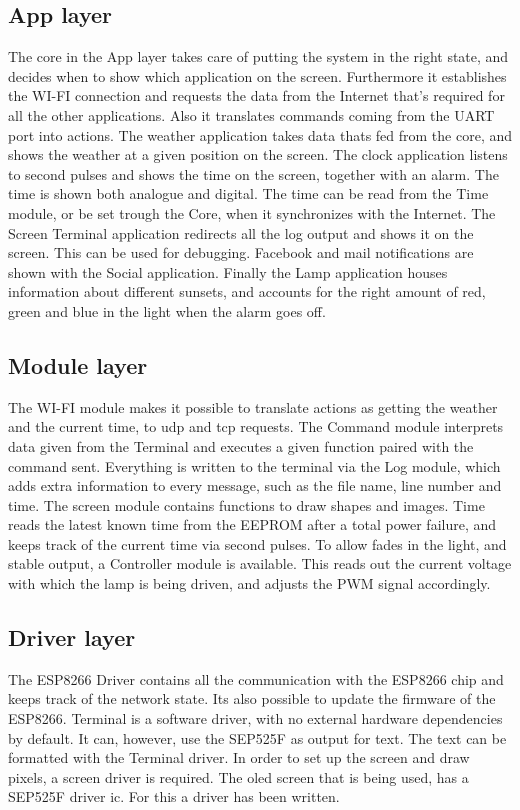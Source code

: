 \subsection{App layer} The core in the App layer takes care of putting the system in the right state, and decides when to show which application on the screen. Furthermore it establishes the WI-FI connection and requests the data from the Internet that's required for all the other applications. Also it translates commands coming from the UART port into actions. The weather application takes data thats fed from the core, and shows the weather at a given position on the screen. The clock application listens to second pulses and shows the time on the screen, together with an alarm. The time is shown both analogue and digital. The time can be read from the Time module, or be set trough the Core, when it synchronizes with the Internet. The Screen Terminal application redirects all the log output and shows it on the screen. This can be used for debugging. Facebook and mail notifications are shown with the Social application. Finally the Lamp application houses information about different sunsets, and accounts for the right amount of red, green and blue in the light when the alarm goes off.
\subsection{Module layer}
The WI-FI module makes it possible to translate actions as getting the weather and the current time, to udp and tcp requests. The Command module interprets data given from the Terminal and executes a given function paired with the command sent. Everything is written to the terminal via the Log module, which adds extra information to every message, such as the file name, line number and time. The screen module contains functions to draw shapes and images. Time reads the latest known time from the EEPROM after a total power failure, and keeps track of the current time via second pulses. To allow fades in the light, and stable output, a Controller module is available. This reads out the current voltage with which the lamp is being driven, and adjusts the PWM signal accordingly. 
\subsection{Driver layer}
The ESP8266 Driver contains all the communication with the ESP8266 chip and keeps track of the network state. Its also possible to update the firmware of the ESP8266. Terminal is a software driver, with no external hardware dependencies by default. It can, however, use the SEP525F as output for text. The text can be formatted with the Terminal driver. In order to set up the screen and draw pixels, a screen driver is required. The oled screen that is being used, has a SEP525F driver ic. For this a driver has been written.
